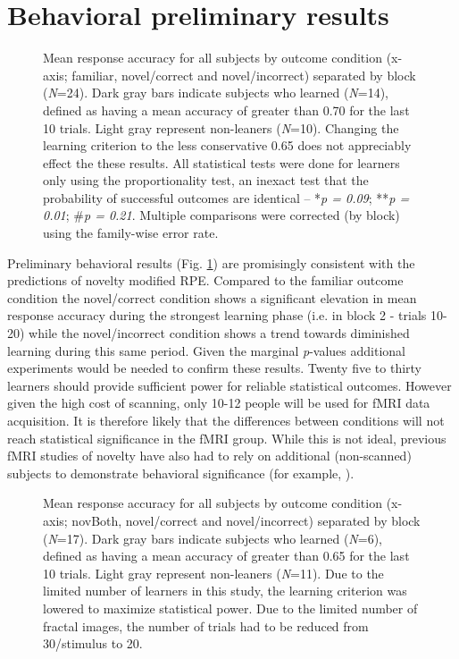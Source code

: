 \documentclass[doc]{apa}        %
\begin{document}
\section{Behavioral preliminary results} %
\label{sec:preliminary_results}

\begin{figure}[tp]
\caption{Mean response accuracy for all subjects by outcome condition (x-axis; familiar, novel/correct and novel/incorrect) separated by block (\emph{N}=24).  Dark gray bars indicate subjects who learned (\emph{N}=14), defined as having a mean accuracy of greater than 0.70 for the last 10 trials.  Light gray represent non-leaners (\emph{N}=10).  Changing the learning criterion to the less conservative 0.65 does not appreciably effect the these results. All statistical tests were done for learners only using the proportionality test, an inexact test that the probability of successful outcomes are identical -- *\emph{p = 0.09}; **\emph{p = 0.01}; \#\emph{p = 0.21}.  Multiple comparisons were corrected (by block) using the family-wise error rate.}
\label{fig:prelimAcc}
\end{figure}

Preliminary behavioral results (Fig. \ref{fig:prelimAcc}) are promisingly consistent with the predictions of novelty modified RPE.  Compared to the familiar outcome condition the novel/correct condition shows a significant elevation in mean response accuracy during the strongest learning phase (i.e. in block 2 - trials 10-20) while the novel/incorrect condition shows a trend towards diminished learning during this same period.  Given the marginal \emph{p}-values additional experiments would be needed to confirm these results.  Twenty five to thirty learners should provide sufficient power for reliable statistical outcomes.  However given the high cost of scanning, only 10-12 people will be used for fMRI data acquisition.  It is therefore likely that the differences between conditions will not reach statistical significance in the fMRI group.  While this is not ideal, previous fMRI studies of novelty have also had to rely on additional (non-scanned) subjects to demonstrate behavioral significance (for example, ).

\begin{figure}[tp]
\caption{Mean response accuracy for all subjects by outcome condition (x-axis; novBoth, novel/correct and novel/incorrect) separated by block (\emph{N}=17).  Dark gray bars indicate subjects who learned (\emph{N}=6), defined as having a mean accuracy of greater than 0.65 for the last 10 trials.  Light gray represent non-leaners (\emph{N}=11).  Due to the limited number of learners in this study, the learning criterion was lowered to maximize statistical power.  Due to the limited number of fractal images, the number of trials had to be reduced from 30/stimulus to 20.}
\label{fig:novBoth}
\end{figure}
\end{document}
